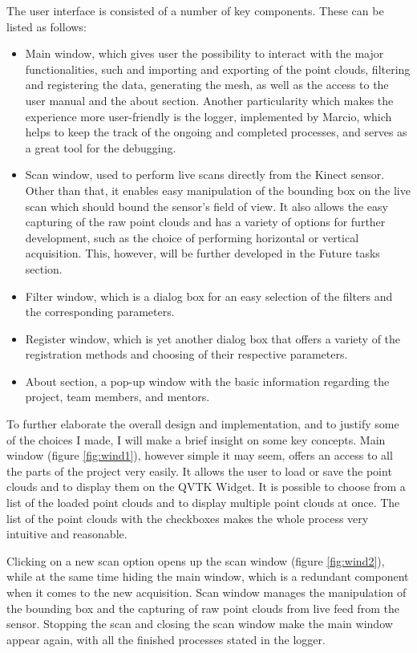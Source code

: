 \documentclass[aps,letterpaper,11pt]{revtex4}
\begin{document}
The user interface is consisted of a number of key components. These can be listed as follows:
\begin{itemize}
\item Main window, which gives user the possibility to interact with the major functionalities, such and importing and exporting of the point clouds, filtering and registering the data, generating the mesh, as well as the access to the user manual and the about section. Another particularity which makes the experience more user-friendly is the logger, implemented by Marcio, which helps to keep the track of the ongoing and completed processes, and serves as a great tool for the debugging. 
\item Scan window, used to perform live scans directly from the Kinect sensor. Other than that, it enables easy manipulation of the bounding box on the live scan which should bound the sensor’s field of view. It also allows the easy capturing of the raw point clouds and has a variety of options for further development, such as the choice of performing horizontal or vertical acquisition. This, however, will be further developed in the Future tasks section. 
\item Filter window, which is a dialog box for an easy selection of the filters and the corresponding parameters. 
\item Register window, which is yet another dialog box that offers a variety of the registration methods and choosing of their respective parameters. 
\item About section, a pop-up window with the basic information regarding the project, team members, and mentors.
\end{itemize}\par
To further elaborate the overall design and implementation, and to justify some of the choices I made, I will make a brief insight on some key concepts. Main window (figure \ref {fig:wind1}), however simple it may seem, offers an access to all the parts of the project very easily. It allows the user to load or save the point clouds and to display them on the QVTK Widget. It is possible to choose from a list of the loaded point clouds and to display multiple point clouds at once. The list of the point clouds with the checkboxes makes the whole process very intuitive and reasonable. \par
Clicking on a new scan option opens up the scan window (figure \ref {fig:wind2}), while at the same time hiding the main window, which is a redundant component when it comes to the new acquisition. Scan window manages the manipulation of the bounding box and the capturing of raw point clouds from live feed from the sensor. Stopping the scan and closing the scan window make the main window appear again, with all the finished processes stated in the logger.\par
\end{document}
